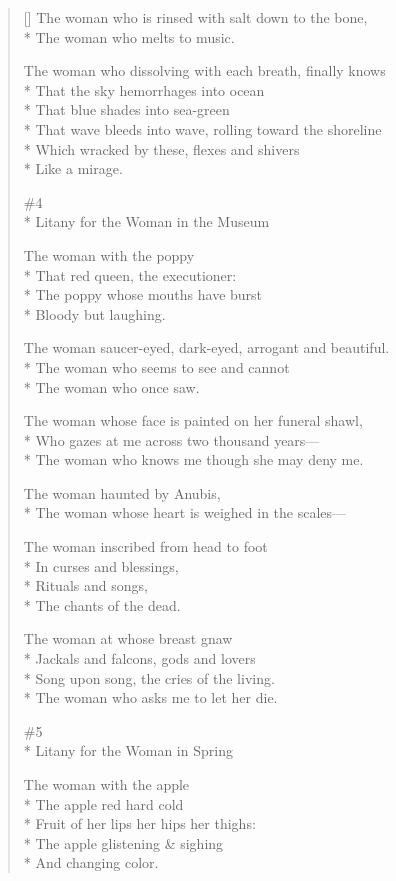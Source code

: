 \begin{verse}[\versewidth]
The woman who is rinsed with salt down to the bone,\\*
The woman who melts to music.

The woman who dissolving with each breath, finally knows\\*
That the sky hemorrhages into ocean\\*
That blue shades into sea-green\\*
That wave bleeds into wave, rolling toward the shoreline\\*
Which wracked by these, flexes and shivers\\*
Like a mirage.

\#4\\*
Litany for the Woman in the Museum

The woman with the poppy\\*
That red queen, the executioner:\\*
The poppy whose mouths have burst\\*
Bloody but laughing.

The woman saucer-eyed, dark-eyed, arrogant and beautiful.\\*
The woman who seems to see and cannot\\*
The woman who once saw.

The woman whose face is painted on her funeral shawl,\\*
Who gazes at me across two thousand years---\\*
The woman who knows me though she may deny me.

The woman haunted by Anubis,\\*
The woman whose heart is weighed in the scales---

The woman inscribed from head to foot\\*
In curses and blessings,\\*
Rituals and songs,\\*
The chants of the dead.

The woman at whose breast gnaw\\*
Jackals and falcons, gods and lovers\\*
Song upon song, the cries of the living.\\*
The woman who asks me to let her die.

\#5\\*
Litany for the Woman in Spring

The woman with the apple\\*
The apple red hard cold\\*
Fruit of her lips her hips her thighs:\\*
The apple glistening \& sighing\\*
And changing color.


\end{verse}
